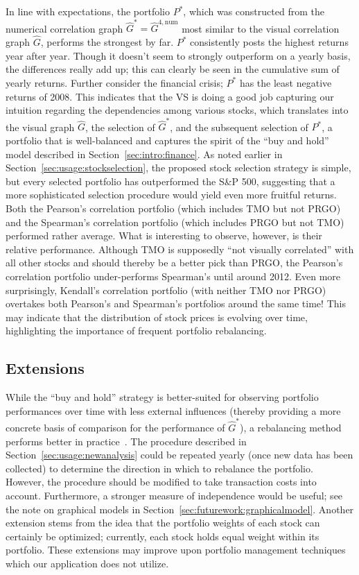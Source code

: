 In line with expectations, the portfolio $P^*$, which was constructed from the 
numerical correlation graph $\hat{G}^* = \hat{G}^{4,\text{num}}$ most similar 
to the visual correlation graph $\hat{G}$, 
performs the strongest by far. $P^*$ consistently posts the highest returns 
year after year. Though it doesn't seem to strongly outperform on a yearly 
basis, the differences really add up; this can clearly be seen in the 
cumulative sum of yearly returns. Further 
consider the financial crisis; $P^*$ has the least negative returns of 2008. 
This indicates that the VS is doing a good job capturing our intuition 
regarding the dependencies among various stocks, which translates into the 
visual graph $\hat{G}$, the selection of $\hat{G}^*$, and the subsequent 
selection of $P^*$, 
a portfolio that is well-balanced and captures the spirit of the ``buy and 
hold'' model described in Section~\ref{sec:intro:finance}.
As noted earlier in Section~\ref{sec:usage:stockselection}, the proposed stock 
selection strategy is simple, but every selected portfolio has outperformed the 
S\&P 500, suggesting that a more sophisticated selection procedure would 
yield even more fruitful returns.
Both the Pearson's correlation portfolio (which includes TMO but not PRGO) and 
the Spearman's correlation portfolio (which includes PRGO but not TMO) 
performed rather average. What is interesting to observe, however, is their 
relative performance. Although TMO is supposedly ``not visually correlated'' 
with all other stocks and should thereby be a better pick than PRGO, the 
Pearson's correlation portfolio under-performs Spearman's until around 2012. 
Even more surprisingly, Kendall's correlation portfolio (with neither TMO nor 
PRGO) overtakes both Pearson's and Spearman's portfolios
around the same time! This may indicate that the distribution of stock prices 
is evolving over time, highlighting the importance of frequent  portfolio 
rebalancing.

\subsection{Extensions}
\label{sec:usage:extensions}

While the ``buy and hold'' strategy is better-suited for 
observing portfolio performances over time with less external influences 
(thereby providing a more concrete basis of comparison for the performance of 
$\hat{G}^*$), a rebalancing method performs better in practice~\cite{liuh2016}.
The procedure described in Section~\ref{sec:usage:newanalysis} could be 
repeated yearly (once new data has been collected) to determine the direction 
in which to rebalance the portfolio. However, the procedure should be modified 
to take transaction costs into account. Furthermore, a stronger measure of 
independence would be useful; see the note on graphical models in 
Section~\ref{sec:futurework:graphicalmodel}. Another extension stems from the 
idea that the 
portfolio weights of each stock can certainly be optimized; currently, each 
stock holds equal weight within its portfolio. These extensions may improve 
upon portfolio management techniques which our application does not utilize.

